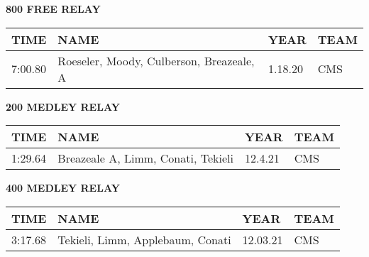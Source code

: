 \begin{table}[H]
\centering
\begin{minipage}[t]{0.6\textwidth}
\centering
\textbf{800 FREE RELAY}\\[0.1cm]
\begin{tabular}{@{}p{1.8cm}p{2.8cm}p{1.2cm}p{1.4cm}@{}}
\hline
    \textbf{TIME} & \textbf{NAME} & \textbf{YEAR} & \textbf{TEAM} \\
\hline
    7:00.80 & Roeseler, Moody, Culberson, Breazeale, A & 1.18.20 & CMS \\
\hline
\end{tabular}
\end{minipage}
\end{table}

\begin{table}[H]
\centering
\begin{minipage}[t]{0.6\textwidth}
\centering
\textbf{200 MEDLEY RELAY}\\[0.1cm]
\begin{tabular}{@{}p{1.8cm}p{2.8cm}p{1.2cm}p{1.4cm}@{}}
\hline
    \textbf{TIME} & \textbf{NAME} & \textbf{YEAR} & \textbf{TEAM} \\
\hline
    1:29.64 & Breazeale A, Limm, Conati, Tekieli & 12.4.21 & CMS \\
\hline
\end{tabular}
\end{minipage}
\end{table}

\begin{table}[H]
\centering
\begin{minipage}[t]{0.6\textwidth}
\centering
\textbf{400 MEDLEY RELAY}\\[0.1cm]
\begin{tabular}{@{}p{1.8cm}p{2.8cm}p{1.2cm}p{1.4cm}@{}}
\hline
    \textbf{TIME} & \textbf{NAME} & \textbf{YEAR} & \textbf{TEAM} \\
\hline
    3:17.68 & Tekieli, Limm, Applebaum, Conati & 12.03.21 & CMS \\
\hline
\end{tabular}
\end{minipage}
\end{table}


\newpage

